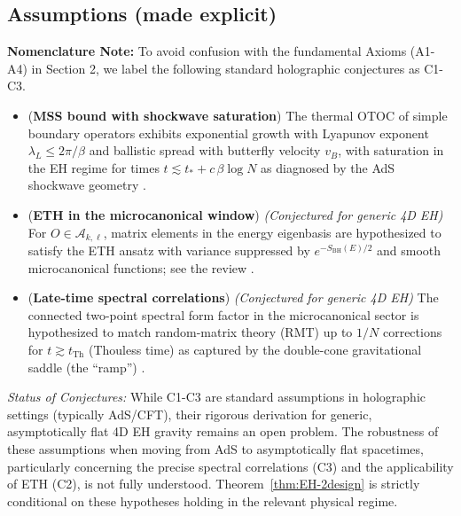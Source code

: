\documentclass[a4paper,11pt]{article}
\let\mathscr\mathcal
\theoremstyle{plain}
\theoremstyle{definition}
\theoremstyle{remark}
\begin{document}
\subsection*{Assumptions (made explicit)}
\textbf{Nomenclature Note:} To avoid confusion with the fundamental Axioms (A1-A4) in Section 2, we label the following standard holographic conjectures as C1-C3.
\begin{itemize}[leftmargin=*]
  \item[C1.] ({\bf MSS bound with shockwave saturation}) The thermal OTOC of simple boundary operators exhibits exponential growth with Lyapunov exponent $\lambda_L\le 2\pi/\beta$ and ballistic spread with butterfly velocity $v_B$, with saturation in the EH regime for times $t\lesssim t_\ast+c\,\beta\log N$ as diagnosed by the AdS shockwave geometry \cite{MaldacenaShenkerStanford2016,ShenkerStanford2014}.
  \item[C2.] ({\bf ETH in the microcanonical window}) \textit{(Conjectured for generic 4D EH)} For $O\in \mathscr{A}_{k,\ell}$, matrix elements in the energy eigenbasis are hypothesized to satisfy the ETH ansatz with variance suppressed by $e^{-S_{\mathrm{BH}}(E)/2}$ and smooth microcanonical functions; see the review \cite{DAlessioKafriPolkovnikovRigol2016}.
  \item[C3.] ({\bf Late-time spectral correlations}) \textit{(Conjectured for generic 4D EH)} The connected two-point spectral form factor in the microcanonical sector is hypothesized to match random-matrix theory (RMT) up to $1/N$ corrections for $t\gtrsim t_{\mathrm{Th}}$ (Thouless time) as captured by the double-cone gravitational saddle (the ``ramp'') \cite{SaadShenkerStanford2019,CotlerEtAl2017}.
\end{itemize}

\noindent\textit{Status of Conjectures:} While C1-C3 are standard assumptions in holographic settings (typically AdS/CFT), their rigorous derivation for generic, asymptotically flat 4D EH gravity remains an open problem. The robustness of these assumptions when moving from AdS to asymptotically flat spacetimes, particularly concerning the precise spectral correlations (C3) and the applicability of ETH (C2), is not fully understood. Theorem~\ref{thm:EH-2design} is strictly conditional on these hypotheses holding in the relevant physical regime.
\end{document}
